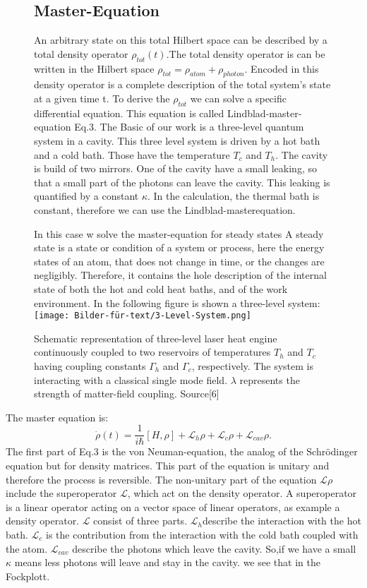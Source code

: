 \documentclass[12pt,a4paper]{article}
\begin{document}
\begin{figure}[h!]
\subsection{Master-Equation} 
An arbitrary state on this total
Hilbert space can be described by a total density operator $\rho_{tot}(t)$.The total density operator is  can be written in the Hilbert space $ \rho_ {tot}= \rho_{atom}+\rho_{photon}$.  Encoded in this density
operator is a complete description of the total system's state at a given time t. To derive the $\rho_{tot}$ we can solve a specific differential equation. This equation is called Lindblad-master-equation Eq.3. 
The Basic of our work is a three-level quantum system in a cavity. This three level system is driven by a hot bath and a cold bath. Those have the temperature $T_c$ and $T_h$. The cavity is build of two mirrors. One of the cavity have a small leaking, so that a small part of the photons can leave the cavity. This leaking is quantified by a constant $\kappa$.
In the calculation, the thermal bath is constant, therefore 
we can use the Lindblad-masterequation. 

In this case w solve the master-equation for steady states
A steady state is a state or condition of a system or process, here the energy states of an atom, that does not change in time, or the changes are negligibly.
Therefore, it contains the hole description of the internal state of both the hot and cold heat baths,
and of the work environment.
In the following figure is shown a three-level system:
\newpage
\texttt{[image: Bilder-für-text/3-Level-System.png]}
\caption{Schematic representation of three-level laser heat engine
continuously coupled to two reservoirs of temperatures $T_h$ and
$T_c$ having coupling constants $\Gamma_h$ and $\Gamma_c$, respectively. The
system is interacting with a classical single mode field. $\lambda$
represents the strength of matter-field coupling. Source[6]}
\end{figure}

The master equation is:
\begin{equation}
\dot{\rho}(t)=\frac{1}{i \hbar}[H,\rho]+ \mathcal{L}_{h}\rho+ \mathcal{L}_{c}\rho+ \mathcal{L}_{cav}\rho.
\end{equation}
The first part of Eq.3 is the von Neuman-equation,  the analog of the Schrödinger equation but for density matrices. This part of the equation is unitary and therefore the process is reversible.
The non-unitary part of the equation $\mathcal{L}\rho$ include the superoperator $\mathcal{L}$, which act on the density operator.  A superoperator is a linear operator acting on a vector space of linear operators, as example a density operator.
$\mathcal{L}$ consist of three parts. $\mathcal{L}_h$describe the interaction with the hot bath.
$\mathcal{L}_c$ is the contribution from the interaction with the cold bath coupled with the atom.
$\mathcal{L}_{cav}$ describe the photons which leave the cavity. So,if we have a small $\kappa$ means less photons will leave and stay in the cavity. we see that in the Fockplott.
\end{document}
